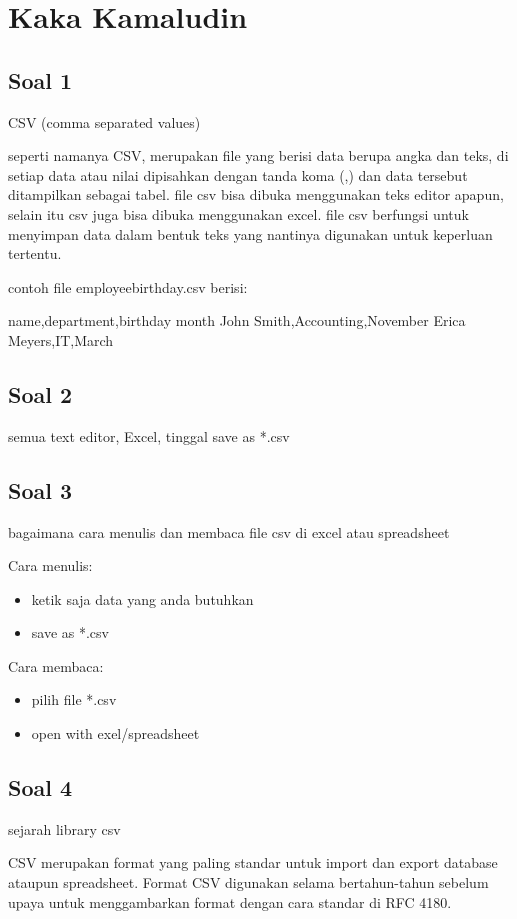 \section{Kaka Kamaludin}
\subsection{Soal 1}
CSV (comma separated values)

seperti namanya CSV, merupakan file yang berisi data berupa angka dan teks, di setiap data atau nilai dipisahkan dengan tanda koma (,) dan data tersebut ditampilkan sebagai tabel. file csv bisa dibuka menggunakan teks editor apapun, selain itu csv juga bisa dibuka menggunakan excel. file csv berfungsi untuk menyimpan data dalam bentuk teks yang nantinya digunakan untuk keperluan tertentu.

contoh file employee\textunderscore birthday.csv berisi:

name,department,birthday month
John Smith,Accounting,November
Erica Meyers,IT,March

\subsection{Soal 2}
semua text editor, Excel, tinggal save as *.csv

\subsection{Soal 3}
bagaimana cara menulis dan membaca file csv di excel atau spreadsheet

Cara menulis:
\begin{itemize}
	\item ketik saja data yang anda butuhkan
	\item save as *.csv
\end{itemize}

Cara membaca:
\begin{itemize}
	\item pilih file *.csv
	\item open with exel/spreadsheet
\end{itemize}

\subsection{Soal 4}
sejarah library csv

CSV merupakan format yang paling standar untuk import dan export database ataupun spreadsheet. Format CSV digunakan selama bertahun-tahun sebelum upaya untuk menggambarkan format dengan cara standar di RFC 4180. 

